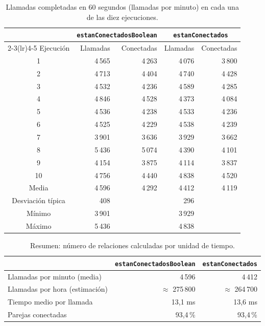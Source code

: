 \documentclass[a4paper,11pt]{report}
\begin{document}
\begin{table}[ht]
\centering
\begin{tabular}{c r r r r}
\toprule
 & \multicolumn{2}{c}{\texttt{estanConectadosBoolean}} & \multicolumn{2}{c}{\texttt{estanConectados}} \\
\cmidrule(lr){2-3}\cmidrule(lr){4-5}
Ejecución & Llamadas & Conectadas & Llamadas & Conectadas \\
\midrule
1 & 4\,565 & 4\,263 & 4\,076 & 3\,800 \\
2 & 4\,713 & 4\,404 & 4\,740 & 4\,428 \\
3 & 4\,532 & 4\,236 & 4\,589 & 4\,285 \\
4 & 4\,846 & 4\,528 & 4\,373 & 4\,084 \\
5 & 4\,536 & 4\,238 & 4\,533 & 4\,236 \\
6 & 4\,525 & 4\,229 & 4\,538 & 4\,239 \\
7 & 3\,901 & 3\,636 & 3\,929 & 3\,662 \\
8 & 5\,436 & 5\,074 & 4\,390 & 4\,101 \\
9 & 4\,154 & 3\,875 & 4\,114 & 3\,837 \\
10 & 4\,756 & 4\,440 & 4\,838 & 4\,520 \\
\midrule
Media & 4\,596 & 4\,292 & 4\,412 & 4\,119 \\
Desviación típica & 408 & & 296 & \\
Mínimo & 3\,901 & & 3\,929 & \\
Máximo & 5\,436 & & 4\,838 & \\
\bottomrule
\end{tabular}
\caption{Llamadas completadas en 60 segundos (llamadas por minuto) en cada una de las diez ejecuciones.}
\end{table}

\begin{table}[ht]
\centering
\begin{tabular}{l r r}
\toprule
 & \texttt{estanConectadosBoolean} & \texttt{estanConectados} \\
\midrule
Llamadas por minuto (media) & 4\,596 & 4\,412 \\
Llamadas por hora (estimación) & $\approx$ 275\,800 & $\approx$ 264\,700 \\
Tiempo medio por llamada & 13{,}1 ms & 13{,}6 ms \\
Parejas conectadas & 93{,}4\,\% & 93{,}4\,\% \\
\bottomrule
\end{tabular}
\caption{Resumen: número de relaciones calculadas por unidad de tiempo.}
\end{table}
\end{document}
